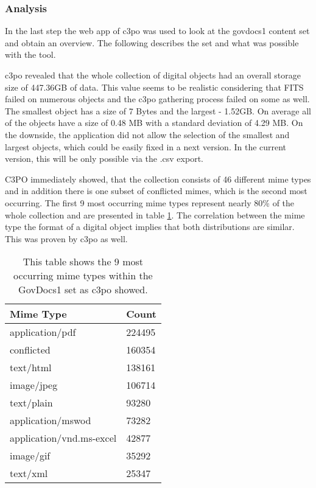 \subsubsection{Analysis}
In the last step the web app of c3po was used to look at the govdocs1 content set and obtain an overview.
The following describes the set and what was possible with the tool.

c3po revealed that the whole collection of digital objects had an overall storage size of 447.36GB of data.
This value seems to be realistic considering that FITS failed on numerous objects and the c3po gathering process failed on some as well.
The smallest object has a size of 7 Bytes and the largest - 1.52GB.
On average all of the objects have a size of 0.48 MB with a standard deviation of 4.29 MB.
On the downside, the application did not allow the selection of the smallest and largest objects, which could be easily fixed in a next version.
In the current version, this will be only possible via the .csv export.

C3PO immediately showed, that the collection consists of 46 different mime types and in addition there is one subset of conflicted mimes, which is the second most occurring.
The first 9 most occurring mime types represent nearly 80\% of the whole collection and are presented in table \ref{tab:govdocs1_mimetypes}.
The correlation between the mime type the format of a digital object implies that both distributions are similar.
This was proven by c3po as well.


\begin{table}[h]
\centering
\begin{tabular}{l || l }
\hline
Mime Type & Count \\
\hline
\hline
 application/pdf & 224495 \\
 conflicted 	& 160354 \\
 text/html		&  138161 \\
 image/jpeg	&  106714 \\
 text/plain		& 93280 \\
 application/mswod & 73282 \\
 application/vnd.ms-excel & 42877 \\
 image/gif		& 35292 \\
 text/xml		& 25347\\
 \hline
\end{tabular}
\caption{This table shows the 9 most occurring mime types within the GovDocs1 set as c3po showed.}
\label{tab:govdocs1_mimetypes}
\end{table}

